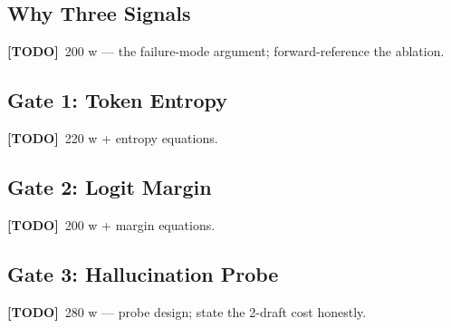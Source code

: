 \documentclass[11pt,a4paper]{report}
\newcommand{\todo}[1]{\par\noindent\textcolor{red!70!black}{\small\textbf{[TODO]}~#1}\par}
\begin{document}
\subsection{Why Three Signals}
\todo{200 w — the failure-mode argument; forward-reference the ablation.}

\subsection{Gate 1: Token Entropy}
\todo{220 w + entropy equations.}

\subsection{Gate 2: Logit Margin}
\todo{200 w + margin equations.}

\subsection{Gate 3: Hallucination Probe}
\todo{280 w — probe design; state the 2-draft cost honestly.}
\end{document}

